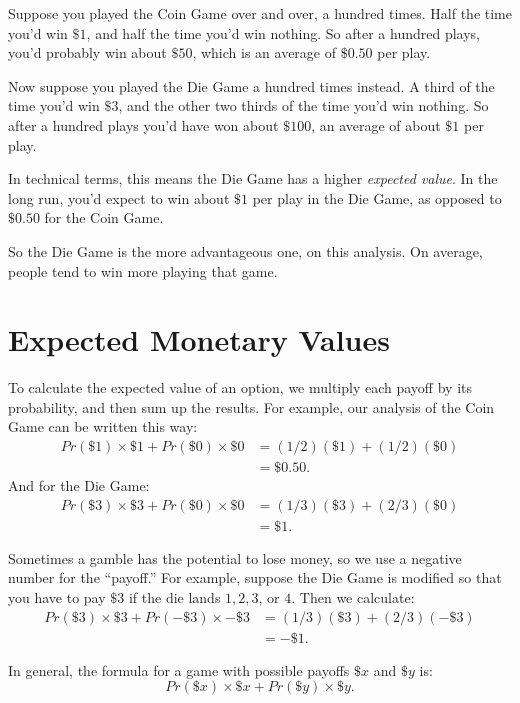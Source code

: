 \documentclass[justified]{tufte-book}
\newcommand{\p}{Pr}
\theoremstyle{definition}
\theoremstyle{definition}
\theoremstyle{definition}
\theoremstyle{definition}
\theoremstyle{remark}
\begin{document}
Suppose you played the Coin Game over and over, a hundred times. Half the time you'd win \(\$1\), and half the time you'd win nothing. So after a hundred plays, you'd probably win about \(\$50\), which is an average of \(\$0.50\) per play.

Now suppose you played the Die Game a hundred times instead. A third of the time you'd win \(\$3\), and the other two thirds of the time you'd win nothing. So after a hundred plays you'd have won about \(\$100\), an average of about \(\$1\) per play.

In technical terms, this means the Die Game has a higher \emph{expected value}. In the long run, you'd expect to win about \(\$1\) per play in the Die Game, as opposed to \(\$0.50\) for the Coin Game.

So the Die Game is the more advantageous one, on this analysis. On average, people tend to win more playing that game.

\hypertarget{expected-monetary-values}{%
\section{Expected Monetary Values}\label{expected-monetary-values}}

To calculate the expected value of an option, we multiply each payoff by its probability, and then sum up the results. For example, our analysis of the Coin Game can be written this way:
\[
  \begin{aligned}
    \p(\$1) \times \$1 + \p(\$0) \times \$0 &= (1/2)(\$1) + (1/2)(\$0)\\
      &= \$0.50.
  \end{aligned}
\]
And for the Die Game:
\[
  \begin{aligned}
    \p(\$3) \times \$3 + \p(\$0) \times \$0 &= (1/3)(\$3) + (2/3)(\$0)\\
      &= \$1.
  \end{aligned}
\]

Sometimes a gamble has the potential to lose money, so we use a negative number for the ``payoff.'' For example, suppose the Die Game is modified so that you have to pay \(\$3\) if the die lands \(1, 2, 3\), or \(4\). Then we calculate:
\[
  \begin{aligned}
    \p(\$3) \times \$3 + \p(-\$3) \times -\$3 &= (1/3)(\$3) + (2/3)(-\$3)\\
      &= -\$1.
  \end{aligned}
\]

In general, the formula for a game with possible payoffs \(\$x\) and \(\$y\) is:
\[ \p(\$x) \times \$x + \p(\$y) \times \$y. \]
\end{document}
